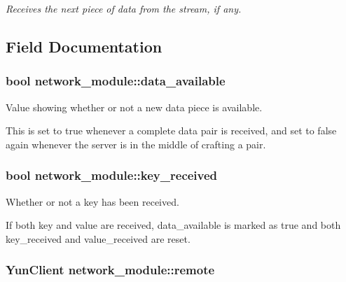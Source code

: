 \begin{DoxyCompactItemize}
\begin{DoxyCompactList}\small\item\em Receives the next piece of data from the stream, if any. \end{DoxyCompactList}\end{DoxyCompactItemize}


\subsection{Field Documentation}
\hypertarget{structnetwork__module_ac0b46ce8ff26aba526e40974b4658d5f}{}
\subsubsection[{data\+\_\+available}]{\setlength{\rightskip}{0pt plus 5cm}bool network\+\_\+module\+::data\+\_\+available}\label{structnetwork__module_ac0b46ce8ff26aba526e40974b4658d5f}


Value showing whether or not a new data piece is available. 

This is set to true whenever a complete data pair is received, and set to false again whenever the server is in the middle of crafting a pair. \hypertarget{structnetwork__module_a4784db26a8a7efad337587b17c3528e5}{}
\subsubsection[{key\+\_\+received}]{\setlength{\rightskip}{0pt plus 5cm}bool network\+\_\+module\+::key\+\_\+received}\label{structnetwork__module_a4784db26a8a7efad337587b17c3528e5}


Whether or not a key has been received. 

If both key and value are received, data\+\_\+available is marked as true and both key\+\_\+received and value\+\_\+received are reset. \hypertarget{structnetwork__module_a2422beb02be2c0bcef02bbbbc43252fe}{}
\subsubsection[{remote}]{\setlength{\rightskip}{0pt plus 5cm}Yun\+Client network\+\_\+module\+::remote}\label{structnetwork__module_a2422beb02be2c0bcef02bbbbc43252fe}


